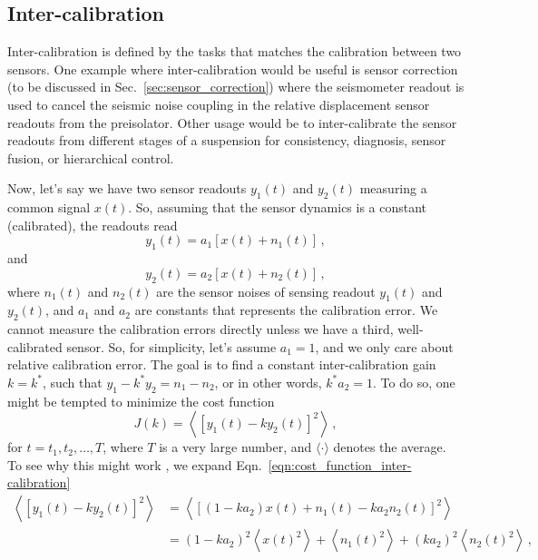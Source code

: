 \subsection{Inter-calibration \label{sec:inter-calibration}}
Inter-calibration is defined by the tasks that matches the calibration between two sensors.
One example where inter-calibration would be useful is sensor correction (to be discussed in Sec.~\ref{sec:sensor_correction}) where the seismometer readout is used to cancel the seismic noise coupling in the relative displacement sensor readouts from the preisolator.
Other usage would be to inter-calibrate the sensor readouts from different stages of a suspension for consistency, diagnosis, sensor fusion, or hierarchical control.

Now, let's say we have two sensor readouts $y_1(t)$ and $y_2(t)$ measuring a common signal $x(t)$.
So, assuming that the sensor dynamics is a constant (calibrated), the readouts read
\begin{equation}
	y_1(t) = a_1\left[x(t) + n_1(t)\right]\,,
\end{equation}
and
\begin{equation}
	y_2(t) = a_2\left[x(t) + n_2(t)\right]\,,
\end{equation}
where $n_1(t)$ and $n_2(t)$ are the sensor noises of sensing readout $y_1(t)$ and $y_2(t)$, and $a_1$ and $a_2$ are constants that represents the calibration error.
We cannot measure the calibration errors directly unless we have a third, well-calibrated sensor.
So, for simplicity, let's assume $a_1=1$, and we only care about relative calibration error.
The goal is to find a constant inter-calibration gain $k=k^*$, such that $y_1 - k^* y_2 = n_1-n_2$, or in other words, $k^* a_2 = 1$.
To do so, one might be tempted to minimize the cost function
\begin{equation}
	J(k) = \left\langle \left[ y_1(t)-ky_2(t) \right]^2\right\rangle\,,
	\label{eqn:cost_function_inter-calibration}
\end{equation}
for $t={t_1,t_2,\dots,T}$, where $T$ is a very large number, and $\langle \cdot \rangle$ denotes the average.
To see why this might work , we expand Eqn.~\eqref{eqn:cost_function_inter-calibration}
\begin{equation}
	\begin{split}
		\left\langle \left[ y_1(t)-ky_2(t) \right]^2\right\rangle &= \left\langle \left[(1-ka_2)x(t) + n_1(t) - ka_2n_2(t) \right]^2 \right\rangle \\
		&= \left(1-ka_2\right)^2\left\langle x(t)^2 \right\rangle + \left\langle n_1(t)^2 \right\rangle + \left(ka_2\right)^2\left\langle n_2(t)^2 \right\rangle \,,
	\end{split}
	\label{eqn:cost_function_inter-calibration_expanded}
\end{equation}
